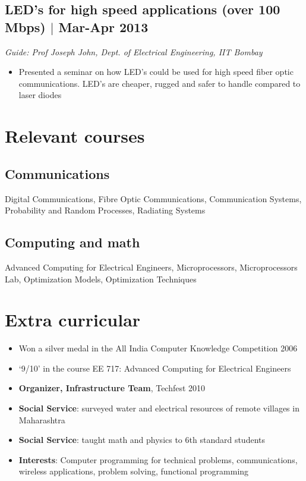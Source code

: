 \documentclass[12pt]{article}
\begin{document}
\subsection*{LED's for high speed applications (over 100 Mbps) $\vert$  Mar-Apr 2013}
\emph{Guide: Prof Joseph John, Dept. of Electrical Engineering, IIT Bombay}  
\begin{itemize}  
\item Presented a seminar on how LED's could be used for high speed fiber optic communications. LED's are cheaper, rugged and safer to handle compared to laser diodes 
\end{itemize}

\section*{Relevant courses}

\subsection*{Communications}
Digital Communications, Fibre Optic Communications, Communication Systems, Probability and Random Processes, Radiating Systems

\subsection*{Computing and math}
Advanced Computing for Electrical Engineers, Microprocessors, Microprocessors Lab, Optimization Models, Optimization Techniques


\section*{Extra curricular}
\begin{itemize}
\item Won a silver medal in the All India Computer Knowledge Competition 2006 
\item `9/10' in the course EE 717: Advanced Computing for Electrical Engineers 
\item \textbf{Organizer, Infrastructure Team}, Techfest 2010 
\item \textbf{Social Service}: surveyed water and electrical resources of remote villages in Maharashtra 
\item \textbf{Social Service}: taught math and physics to 6th standard students 
\item \textbf{Interests}:  Computer programming for technical problems, communications, wireless applications, problem solving, functional programming 
\end{itemize}
\end{document}

